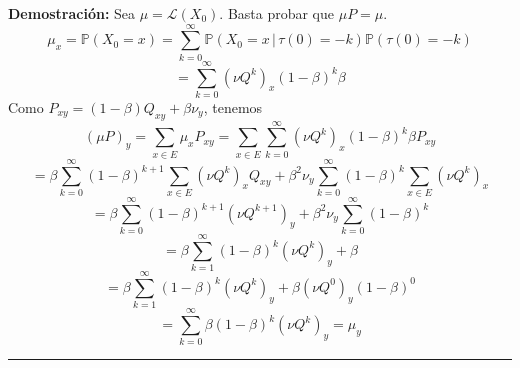 \documentclass[a4paper]{article}
\newcommand{\prob}{\mathbb{P}}
\numberwithin{equation}{subsection}
\numberwithin{definicion}{subsection}
\begin{document}
\textbf{Demostración: }Sea $\mu = \mathcal{L}(X_0)$. Basta probar que $\mu P = \mu$.
\[\mu_x = \prob(X_0=x) = \sum_{k=0}^{\infty}\prob(X_0=x\,|\,\tau(0)=-k)\prob(\tau(0)=-k)\]
\[= \sum_{k=0}^{\infty}(\nu Q^k)_x (1-\beta)^{k}\beta\]
Como $P_{xy} = (1-\beta)Q_{xy} + \beta \nu_y$, tenemos
\[(\mu P)_y = \sum_{x\in E}\mu_x P_{xy} = \sum_{x\in E}\sum_{k=0}^{\infty}(\nu Q^k)_x(1-\beta)^k\beta P_{xy}\]
\[= \beta \sum_{k=0}^{\infty}(1-\beta)^{k+1}\sum_{x\in E}(\nu Q^k)_xQ_{xy} + \beta^2 \nu_y \sum_{k=0}^{\infty}(1-\beta)^k\sum_{x\in E}(\nu Q^k)_x\]
\[= \beta\sum_{k=0}^{\infty}(1-\beta)^{k+1}(\nu Q^{k+1})_y + \beta^2\nu_y\sum_{k=0}^{\infty}(1-\beta)^k\]
\[= \beta\sum_{k=1}^{\infty}(1-\beta)^{k}(\nu Q^{k})_y + \beta\]
\[= \beta\sum_{k=1}^{\infty}(1-\beta)^{k}(\nu Q^{k})_y + \beta(\nu Q^0)_y(1-\beta)^0\]
\[= \sum_{k=0}^{\infty}\beta(1-\beta)^{k}(\nu Q^{k})_y = \mu_y\]
\rule{0.7em}{0.7em}\\ \newline
\end{document}
